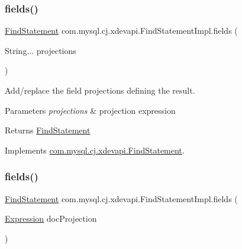 \mbox{\label{classcom_1_1mysql_1_1cj_1_1xdevapi_1_1_find_statement_impl_a0949083d6d4ba7dff81c2ead999373bf}} 
\subsubsection{\texorpdfstring{fields()}{fields()}\hspace{0.1cm}{\footnotesize\ttfamily [1/2]}}
{\footnotesize\ttfamily \mbox{\hyperlink{interfacecom_1_1mysql_1_1cj_1_1xdevapi_1_1_find_statement}{Find\+Statement}} com.\+mysql.\+cj.\+xdevapi.\+Find\+Statement\+Impl.\+fields (\begin{DoxyParamCaption}\item[{String...}]{projections }\end{DoxyParamCaption})}

Add/replace the field projections defining the result.


\begin{DoxyParams}{Parameters}
{\em projections} & projection expression \\
\hline
\end{DoxyParams}
\begin{DoxyReturn}{Returns}
\mbox{\hyperlink{interfacecom_1_1mysql_1_1cj_1_1xdevapi_1_1_find_statement}{Find\+Statement}} 
\end{DoxyReturn}


Implements \mbox{\hyperlink{interfacecom_1_1mysql_1_1cj_1_1xdevapi_1_1_find_statement_a31dcef3b4852a5eb361a03b549eddeaf}{com.\+mysql.\+cj.\+xdevapi.\+Find\+Statement}}.

\mbox{\label{classcom_1_1mysql_1_1cj_1_1xdevapi_1_1_find_statement_impl_a52d3c488bb46564fdab7629781d6c99b}} 
\subsubsection{\texorpdfstring{fields()}{fields()}\hspace{0.1cm}{\footnotesize\ttfamily [2/2]}}
{\footnotesize\ttfamily \mbox{\hyperlink{interfacecom_1_1mysql_1_1cj_1_1xdevapi_1_1_find_statement}{Find\+Statement}} com.\+mysql.\+cj.\+xdevapi.\+Find\+Statement\+Impl.\+fields (\begin{DoxyParamCaption}\item[{\mbox{\hyperlink{classcom_1_1mysql_1_1cj_1_1xdevapi_1_1_expression}{Expression}}}]{doc\+Projection }\end{DoxyParamCaption})}

